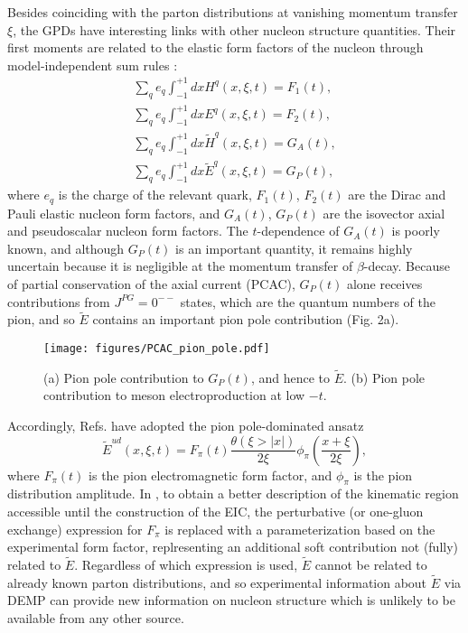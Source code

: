 Besides coinciding with the parton distributions at vanishing momentum transfer
$\xi$, the GPDs have interesting links with other nucleon structure quantities.
Their first moments are related to the elastic form factors of the nucleon
through model-independent sum rules \cite{Ra00}:
\begin{eqnarray}
\sum_q e_q \int^{+1}_{-1} dx H^q(x,\xi,t) = F_1(t),\\
\sum_q e_q \int^{+1}_{-1} dx E^q(x,\xi,t) = F_2(t),\\
\sum_q e_q \int^{+1}_{-1} dx \tilde{H}^q(x,\xi,t) = G_A(t),\\
\sum_q e_q \int^{+1}_{-1} dx \tilde{E}^q(x,\xi,t) = G_P(t),
\end{eqnarray}
where $e_q$ is the charge of the relevant quark, $F_1(t)$, $F_2(t)$ are the
Dirac and Pauli elastic nucleon form factors, and $G_A(t)$, $G_P(t)$ are the
isovector axial and pseudoscalar nucleon form factors.  The $t$-dependence of
$G_A(t)$ is poorly known, and although $G_P(t)$ is an important quantity, it
remains highly uncertain because it is negligible at the momentum transfer of
$\beta$-decay\cite{Th01}.  Because of partial conservation of the axial current
(PCAC), $G_P(t)$ alone
receives contributions from $J^{PG}=0^{--}$ states\cite{Ma69}, which are the
quantum numbers of the pion, and so $\tilde{E}$ contains an important pion pole
contribution (Fig. 2a).

\begin{figure}[hbtp!]
\begin{center}
\texttt{[image: figures/PCAC\_pion\_pole.pdf]}
\end{center}
\caption{\label{fig:PCAC_pion_pole}
\footnotesize{(a) Pion pole contribution to $G_P(t)$, and hence to $\tilde{E}$.
(b) Pion pole contribution to meson electroproduction at low $-t$.}
}
\end{figure}

Accordingly, Refs. \cite{Pe00,Be01} have adopted the pion pole-dominated
ansatz
\begin{equation}
\tilde{E}^{ud}(x,\xi,t) = F_{\pi}(t)\frac{\theta (\xi>|x|)}{2\xi
}\phi_{\pi}(\frac{x+\xi}{2\xi}),
\label{eqn:Etilde}
\end{equation}
where $F_{\pi}(t)$ is the pion electromagnetic form factor, and $\phi_{\pi}$ is
the pion distribution amplitude.  In \cite{Go10}, to obtain a better
description of the kinematic region accessible until the construction of the
EIC, the perturbative (or one-gluon exchange) expression for $F_{\pi}$ is
replaced with a parameterization based on the experimental form factor,
replresenting an additional soft contribution not (fully) related to
$\tilde{E}$.  Regardless of which expression is used, $\tilde{E}$ cannot be
related to already known parton distributions, and so experimental information
about $\tilde{E}$ via DEMP can provide new information on nucleon structure
which is unlikely to be available from any other source.

